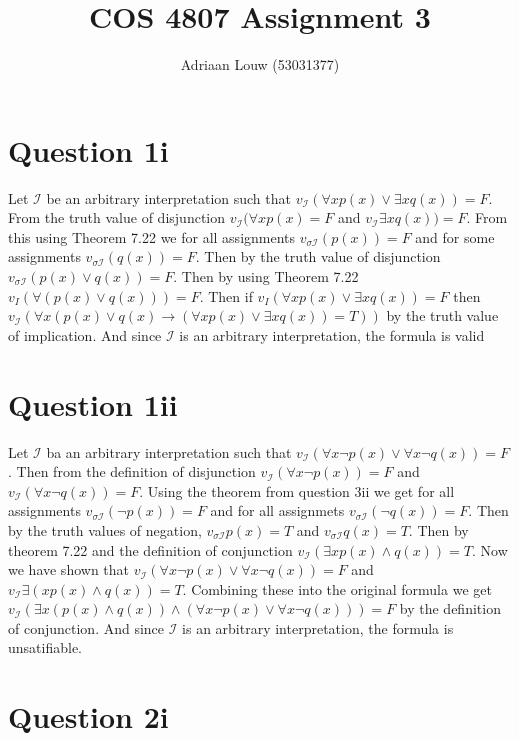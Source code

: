 \documentclass[10pt,a4paper]{article}
\title{COS 4807 Assignment 3}
\author{Adriaan Louw (53031377)}
\newcommand{\interp}{\mathscr{I}}
\begin{document}
\maketitle


\section{Question 1i}
Let $\interp$ be an arbitrary interpretation such that $v_\interp(\forall x p(x)\vee\exists x q(x))=F$. From the truth value of disjunction $v_\interp(\forall xp(x) = F $ and $v_\interp\exists x q(x)) = F$. From this using Theorem 7.22 we for all assignments $v_{\sigma\interp}(p(x)) = F$ and for some assignments $v_{\sigma\interp}(q(x)) = F$. Then by the truth value of disjunction $v_{\sigma\interp}(p(x)\vee q(x)) = F$. Then by using Theorem 7.22 $v_I(\forall(p(x)\vee q(x))) = F$. Then if $v_I(\forall x p(x) \vee \exists x q(x)) = F$ then $v_\interp (\forall x(p(x)\vee q(x) \rightarrow(\forall x p(x)\vee \exists x q(x)) = T))$ by the truth value of implication. And since $\interp$ is an arbitrary interpretation, the formula is valid

\section{Question 1ii}
Let $\interp$ ba an arbitrary interpretation such that $v_\interp (\forall x \neg p(x)\vee\forall x \neg q(x))= F$. Then from the definition of disjunction $v_\interp (\forall x \neg p(x)) = F$ and $v_\interp (\forall x\neg q(x))=F$. Using the theorem from question 3ii we get for all assignments $v_{\sigma\interp} (\neg p(x))=F$ and for all assignmets $v_{\sigma\interp}(\neg q(x))=F$. Then by the truth values of negation, $v_{\sigma\interp}p(x) =T$ and $v_{\sigma\interp}q(x)= T$. Then by theorem 7.22 and the definition of conjunction $v_\interp (\exists x p(x)\wedge q(x))=T$. Now we have shown that  $v_\interp (\forall x \neg p(x)\vee\forall x \neg q(x))= F$ and $v_\interp \exists (x p(x)\wedge q(x))=T$. Combining these into the original formula we get $v_\interp( \exists x (p(x)\wedge q(x)) \wedge (\forall x \neg p(x)\vee\forall x \neg q(x)))= F$ by the definition of conjunction. And since $\interp$ is an arbitrary interpretation, the formula is unsatifiable.

\section{Question 2i}
\end{document}

